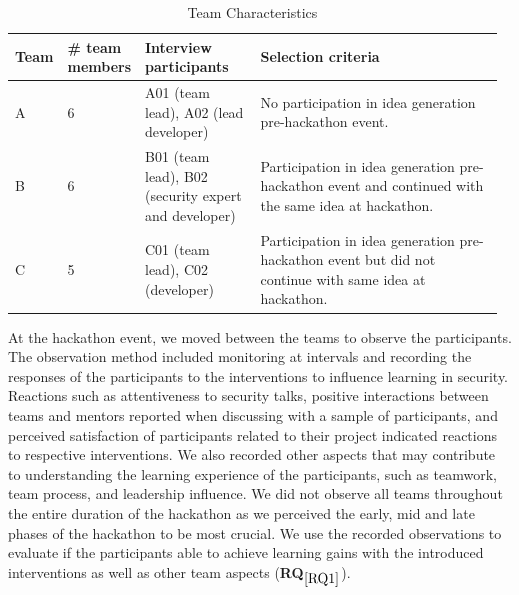 \documentclass[runningheads]{llncs}
\newcommand{\hr}[1]{\textbf{RQ}$_{\ref{#1}}$}
\begin{document}
\begin{table}[h]
\vspace{-10pt}
    \caption{Team Characteristics}
    \label{tab:teamcharacteristics}
    \centering
    \begin{tabular}{|p{0.08\linewidth}|p{0.12\linewidth}|p{0.24\linewidth}|p{0.53\linewidth}|} \hline
	 Team & {\#} team members & Interview participants & Selection criteria \\ \hline
      A  & 6 & A01 (team lead), A02 (lead developer) &  No participation in idea generation pre-hackathon event. \\ \hline
      B  & 6 & B01 (team lead), B02 (security expert and developer) &  Participation in idea generation pre-hackathon event and continued with the same idea at hackathon. \\ \hline
      C  & 5 & C01 (team lead), C02 (developer) & Participation in idea generation pre-hackathon event but did not continue with same idea at hackathon. \\ \hline
    \end{tabular}
     \vspace{-10pt}
\end{table}

At the hackathon event, we moved between the teams to observe the participants. The observation method included monitoring at intervals and recording the responses of the participants to the interventions to influence learning in security.
Reactions such as attentiveness to security talks, positive interactions between teams and mentors reported when discussing with a sample of participants, and perceived satisfaction of participants related to their project indicated reactions to respective interventions. We also recorded other aspects that may contribute to understanding the learning experience of the participants, such as teamwork, team process, and leadership influence. 
We did not observe all teams throughout the entire duration of the hackathon as we perceived the early, mid and late phases of the hackathon to be most crucial.
We use the recorded observations to evaluate if the participants able to achieve learning gains with the introduced interventions as well as other team aspects (\hr{RQ1}). 
\end{document}
